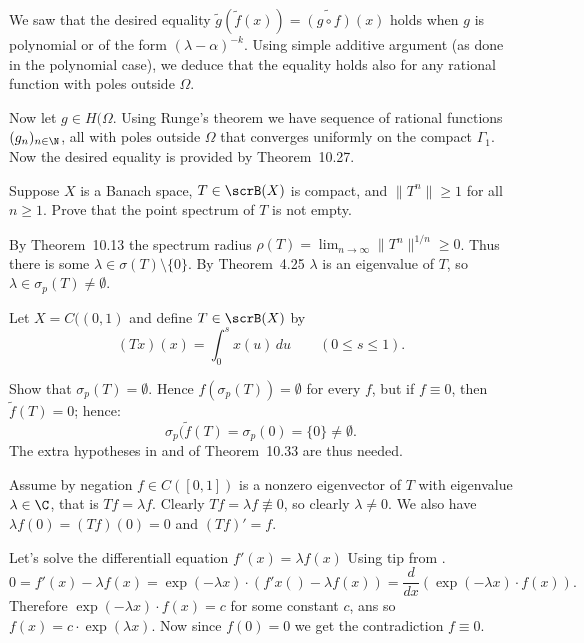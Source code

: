 \begin{enumerate}
\begin{itemize}
We saw that the desired equality
\(\widetilde{g}\left(\widetilde{f}(x)\right) = \widetilde{(g \circ f)}(x)\)
holds when $g$ is polynomial or of the form \((\lambda - \alpha)^{-k}\).
Using simple additive argument (as done in the polynomial case),
we deduce that the equality holds also for any rational function
with poles outside \(\Omega\).

Now let \(g\in H(\Omega\).
Using Runge's theorem we have sequence of rational functions \((g_n)_{n\in\N}\),
all with poles outside \(\Omega\) that converges uniformly
on the compact \(\Gamma_1\).
Now the desired equality is provided by Theorem~10.27.
\end{itemize}

\begin{excopy}
Suppose $X$ is a Banach space, \(T \in \scrB(X)\) is compact,
and \(\|T^n\| \geq 1\) for all \(n \geq 1\).
Prove that the point spectrum of $T$ is not empty.
\end{excopy}

By Theorem~10.13 the spectrum radius
\(\rho(T) = \lim_{n\to\infty} \|T^n\|^{1/n} \geq 0\).
Thus there is some \(\lambda \in \sigma(T)\setminus\{0\}\).
By Theorem~4.25 \(\lambda\) is an eigenvalue of $T$,
so \(\lambda \in \sigma_p(T) \neq \emptyset\).

\begin{excopy}
Let \(X = C((0, 1)\) and define \(T \in \scrB(X)\) by
\begin{equation*}
(Tx)(x) = \int_0^s x(u)\,du \qquad (0\leq s\leq 1).
\end{equation*}

Show that \(\sigma_p(T) = \emptyset\).
Hence \(f(\sigma_p(T)) = \emptyset\) for every $f$, but if \(f\equiv 0\),
then \(\widetilde{f}(T) = 0\); hence:
\begin{equation*}
\sigma_p(\widetilde{f}(T) = \sigma_p(0) = \{0\} \neq \emptyset.
\end{equation*}
The extra hypotheses in  and  of Theorem~10.33 are thus needed.
\end{excopy}

Assume by negation \(f\in C([0,1])\) is a nonzero eigenvector of $T$
with eigenvalue \(\lambda\in \C\), that is \(Tf = \lambda f\).
Clearly \(Tf = \lambda f \not\equiv 0\), so clearly \(\lambda\neq 0\).
We also have \(\lambda f(0) = (Tf)(0) = 0\) and \((Tf)' = f\).

Let's solve the differentiall equation \(f'(x)=\lambda f(x)\)
Using tip from \cite{coddington1984theory}.
\begin{equation*}
0 = f'(x) - \lambda f(x) 
  = \exp(-\lambda x)\cdot(f'x() - \lambda f(x))
  = \frac{d}{dx} \left(\exp(-\lambda x)\cdot f(x)\right).
\end{equation*}
Therefore \(\exp(-\lambda x)\cdot f(x) = c\) for some constant $c$,
ans so \(f(x) = c \cdot \exp(\lambda x)\).
Now since \(f(0) = 0\) we get the contradiction \(f\equiv 0\).


\end{enumerate}
